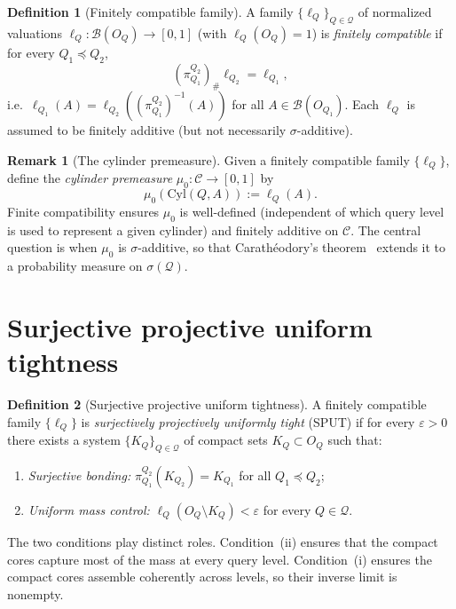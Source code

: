 \documentclass[11pt]{article}
\theoremstyle{definition}
\newtheorem{definition}{Definition}
\newtheorem{remark}{Remark}
\newcommand{\Qcal}{\mathcal{Q}}
\newcommand{\Bcal}{\mathcal{B}}
\newcommand{\Ccal}{\mathcal{C}}
\begin{document}
\begin{definition}[Finitely compatible family]
A family $\{\ell_Q\}_{Q \in \Qcal}$ of normalized valuations
$\ell_Q : \Bcal(O_Q) \to [0,1]$ (with $\ell_Q(O_Q) = 1$) is
\emph{finitely compatible} if for every $Q_1 \preceq Q_2$,
\[
(\pi^{Q_2}_{Q_1})_\# \ell_{Q_2} = \ell_{Q_1},
\]
i.e.\ $\ell_{Q_1}(A) = \ell_{Q_2}((\pi^{Q_2}_{Q_1})^{-1}(A))$ for
all $A \in \Bcal(O_{Q_1})$.  Each $\ell_Q$ is assumed to be
finitely additive (but not necessarily $\sigma$-additive).
\end{definition}

\begin{remark}[The cylinder premeasure]
Given a finitely compatible family $\{\ell_Q\}$, define the
\emph{cylinder premeasure} $\mu_0 : \Ccal \to [0,1]$ by
\[
\mu_0(\mathrm{Cyl}(Q, A)) := \ell_Q(A).
\]
Finite compatibility ensures $\mu_0$ is well-defined (independent of
which query level is used to represent a given cylinder) and
finitely additive on $\Ccal$.  The central question is when $\mu_0$
is $\sigma$-additive, so that Carath\'eodory's theorem~\cite{Billingsley1995,Bogachev2007} extends it
to a probability measure on $\sigma(\Qcal)$.
\end{remark}

\section{Surjective projective uniform tightness}\label{sec:sput}

\begin{definition}[Surjective projective uniform tightness]
\label{def:sput}
A finitely compatible family $\{\ell_Q\}$ is \emph{surjectively
projectively uniformly tight} (SPUT) if for every $\varepsilon > 0$
there exists a system $\{K_Q\}_{Q \in \Qcal}$ of compact sets
$K_Q \subset O_Q$ such that:
\begin{enumerate}[label=(\roman*)]
\item \emph{Surjective bonding:}
  $\pi^{Q_2}_{Q_1}(K_{Q_2}) = K_{Q_1}$ for all $Q_1 \preceq Q_2$;
\item \emph{Uniform mass control:}
  $\ell_Q(O_Q \setminus K_Q) < \varepsilon$ for every $Q \in \Qcal$.
\end{enumerate}
\end{definition}

The two conditions play distinct roles.  Condition~(ii) ensures that
the compact cores capture most of the mass at every query level.
Condition~(i) ensures the compact cores assemble coherently across
levels, so their inverse limit is nonempty.
\end{document}
